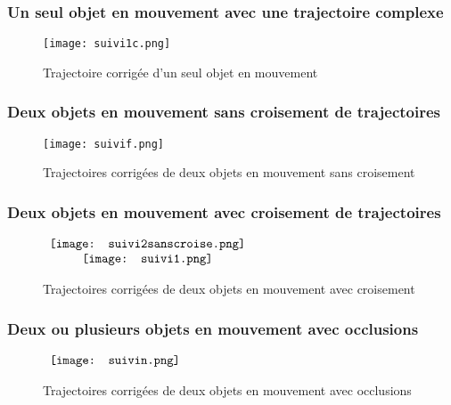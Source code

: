 \documentclass[french,12pt,a4paper,oneside,notitlepage]{report}
\begin{document}
\subsubsection{Un seul objet en mouvement avec une trajectoire complexe}
\begin{figure}[ht]
	\begin{center}
		\texttt{[image: suivi1c.png]}
	\end{center}
	\caption{Trajectoire corrigée d'un seul objet en mouvement}
\end{figure}
\subsubsection{Deux objets en mouvement sans croisement de trajectoires}
\begin{figure}[ht]
	\begin{center}
		\texttt{[image: suivif.png]}
	\end{center}
	\caption{Trajectoires corrigées de deux objets en mouvement sans croisement}
\end{figure}
\subsubsection{Deux objets en mouvement avec croisement de trajectoires}
\begin{figure}[ht]
	\begin{center}$
		\begin{array}[h]{c}
		  \texttt{[image: suivi2sanscroise.png]}\\
		  \texttt{[image: suivi1.png]}\\
		\end{array}$
	\end{center}
	\caption{Trajectoires corrigées de deux objets en mouvement avec croisement}
\end{figure}
\subsubsection{Deux ou plusieurs objets en mouvement avec occlusions}
\begin{figure}[ht]
	\begin{center}$
		\begin{array}[h]{c}
		  \texttt{[image: suivin.png]}
		\end{array}$
	\end{center}
	\caption{Trajectoires corrigées de deux objets en mouvement avec occlusions}
\end{figure}
\end{document}
